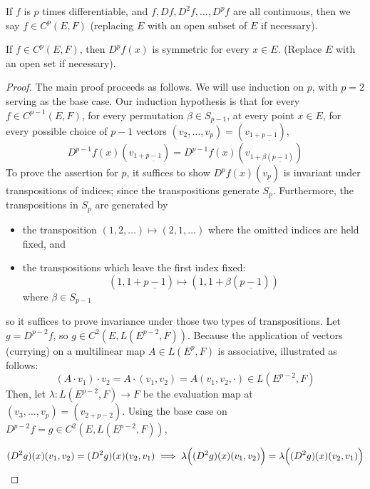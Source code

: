 \documentclass[../main-manifolds.tex]{subfiles}
\begin{document}
If $f$ is $p$ times differentiable, and $f, Df, D^2f, \ldots, D^pf$ are all continuous, then we say $f\in C^p(E,F)$ (replacing $E$ with an open subset of $E$ if necessary). 

\begin{wts}
    If $f\in C^p(E,F)$, then $D^pf(x)$ is symmetric for every $x\in E$. (Replace $E$ with an open set if necessary).
\end{wts}
\begin{proof}
    The main proof proceeds as follows. We will use induction on $p$, with $p=2$ serving as the base case. Our induction hypothesis is that for every $f\in C^{p-1}(E,F)$, for every permutation $\beta\in S_{p-1}$, at every point $x\in E$, for every possible choice of $p-1$ vectors $(v_2,\ldots, v_{p}) = (v_{1 + \underline{p-1}})$,
    \[
        D^{p-1}f(x)(v_{1+\underline{p-1}}) = D^{p-1}f(x)(v_{1+\beta(\underline{p-1})})
    \]
    To prove the assertion for $p$, it suffices to show $D^pf(x)(v_{\underline{p}})$ is invariant under transpositions of indices; since the transpositions generate $S_p$. Furthermore, the transpositions in $S_p$ are generated by 
    
    \begin{itemize}
        \item the transposition $(1,2,\ldots)\mapsto (2,1,\ldots)$ where the omitted indices are held fixed, and
        \item the transpositions which leave the first index fixed:
        \[
            (1,1+\underline{p-1})\mapsto (1,1+\beta({\underline{p-1}}))
        \]
        where $\beta\in S_{p-1}$
    \end{itemize}

    so it suffices to prove invariance under those two types of transpositions. Let $g = D^{p-2}f$, so $g\in C^2(E, L(E^{p-2}, F))$. Because the application of vectors (currying) on a multilinear map $A\in L(E^p, F)$ is associative, illustrated as follows:
    \[
       (A\cdot v_1)\cdot v_2 = A\cdot (v_1,v_2) = A(v_1, v_2,\cdot)\in L(E^{p-2}, F)
    \]
    Then, let $\lambda: L(E^{p-2}, F)\to F$ be the evaluation map at $(v_3,\ldots, v_p) = (v_{2+\underline{p-2}})$. 
    Using the base case on $D^{p-2}f = g\in C^2(E, L(E^{p-2}, F))$, 

    \[
        (D^2g)(x)(v_1,v_2) = (D^2g)(x)(v_2,v_1)\implies \lambda\qty\Big((D^2g)(x)(v_1,v_2)) = \lambda\qty\Big((D^2g)(x)(v_2,v_1))
    \]


\end{proof}
\end{document}
